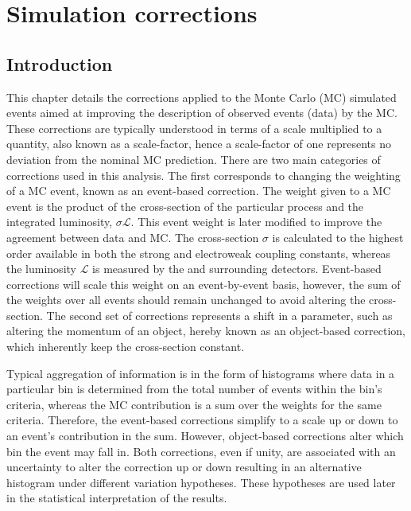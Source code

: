 \chapter{Simulation corrections}
\label{chap:simulation-corrections}


\section{Introduction}

This chapter details the corrections applied to the Monte Carlo (MC) simulated  events aimed at improving the description of observed events (data) by the MC. These corrections are typically understood in terms of a scale multiplied to a quantity, also known as a scale-factor, hence a scale-factor of one represents no deviation from the nominal MC prediction. There are two main categories of corrections used in this analysis. The first corresponds to changing the weighting of a MC event, known as an event-based correction. The weight given to a MC event is the product of the cross-section of the particular process and the integrated luminosity, $\sigma \mathcal{L}$. This event weight is later modified to improve the agreement between data and MC. The cross-section $\sigma$ is calculated to the highest order available in both the strong and electroweak coupling constants, whereas the luminosity $\mathcal{L}$ is measured by the \CMS and surrounding detectors. Event-based corrections will scale this weight on an event-by-event basis, however, the sum of the weights over all events should remain unchanged to avoid altering the cross-section. The second set of corrections represents a shift in a parameter, such as altering the momentum of an object, hereby known as an object-based correction, which inherently keep the cross-section constant.

Typical aggregation of information is in the form of histograms where data in a particular bin is determined from the total number of events within the bin's criteria, whereas the MC contribution is a sum over the weights for the same criteria. Therefore, the event-based corrections simplify to a scale up or down to an event's contribution in the sum. However, object-based corrections alter which bin the event may fall in. Both corrections, even if unity, are associated with an uncertainty to alter the correction up or down resulting in an alternative histogram under different variation hypotheses. These hypotheses are used later in the statistical interpretation of the results.

